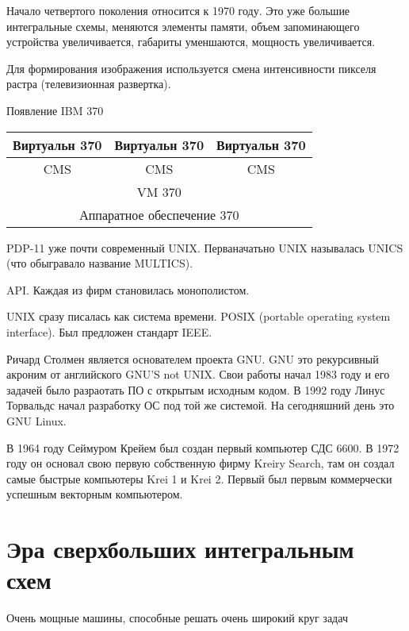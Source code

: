 \documentclass[a4paper, 14pt]{report}
\begin{document}
    Начало четвертого поколения относится к 1970 году. Это уже большие интегральные схемы, меняются элементы памяти, объем запоминающего устройства увеличивается, габариты уменшаются, мощность увеличивается.

    Для формирования изображения используется смена интенсивности пикселя растра (телевизионная развертка).

    Появление IBM 370

    \begin{center}
        \begin{tabular}{|c|c|c|}
            \hline
            Виртуальн 370 & Виртуальн 370 & Виртуальн 370 \\
            \hline
            CMS & CMS & CMS \\
            \hline
            \multicolumn{3}{|c|}{VM 370} \\
            \hline
            \multicolumn{3}{|c|}{Аппаратное обеспечение 370} \\
            \hline
        \end{tabular}
    \end{center}

    PDP-11 уже почти современный UNIX. Перваначатьно UNIX называлась UNICS (что обыгравало название MULTICS).

    API. Каждая из фирм становилась монополистом.

    UNIX сразу писалась как система времени. POSIX (portable operating system interface). Был предложен стандарт IEEE.

    Ричард Столмен является основателем проекта GNU. GNU это рекурсивный акроним от английского GNU'S not UNIX. Свои работы начал 1983 году и его задачей было разраотать ПО с открытым исходным кодом. В 1992 году Линус Торвальдс начал разработку ОС под той же системой. На сегодняшний день это GNU Linux.

    В 1964 году Сеймуром Крейем был создан первый компьютер СДС 6600. В 1972 году он основал свою первую собственную фирму Kreiry Search, там он создал самые быстрые компьютеры Krei 1 и Krei 2. Первый был первым коммерчески успешным векторным компьютером.

    \section{Эра сверхбольших интегральным схем}

    Очень мощные машины, способные решать очень широкий круг задач
\end{document}
